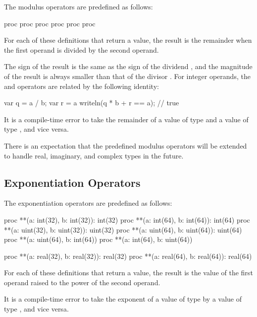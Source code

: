 The modulus operators are predefined as follows:
\begin{chapel}
proc %
proc %
proc %
proc %
proc %
proc %
\end{chapel}
For each of these definitions that return a value, the result is the
remainder when the first operand is divided by the second operand.

The sign of the result is the same as the sign of the dividend , and the
magnitude of the result is always smaller than that of the divisor .
For integer operands, the \chpl{\%} and \chpl{/} operators are related by the
following identity:
\begin{chapel}
var q = a / b;
var r = a %
writeln(q * b + r == a);    // true
\end{chapel}

It is a compile-time error to take the remainder of a value of
type  and a value of type , and vice
versa.

There is an expectation that the predefined modulus operators will be
extended to handle real, imaginary, and complex types in the future.

\subsection{Exponentiation Operators}
\label{Exponentiation_Operators}

The exponentiation operators are predefined as follows:
\begin{chapel}
proc **(a: int(32), b: int(32)): int(32)
proc **(a: int(64), b: int(64)): int(64)
proc **(a: uint(32), b: uint(32)): uint(32)
proc **(a: uint(64), b: uint(64)): uint(64)
proc **(a: uint(64), b: int(64))
proc **(a: int(64), b: uint(64))

proc **(a: real(32), b: real(32)): real(32)
proc **(a: real(64), b: real(64)): real(64)
\end{chapel}
For each of these definitions that return a value, the result is the
value of the first operand raised to the power of the second operand.

It is a compile-time error to take the exponent of a value of
type  by a value of type , and vice
versa.

